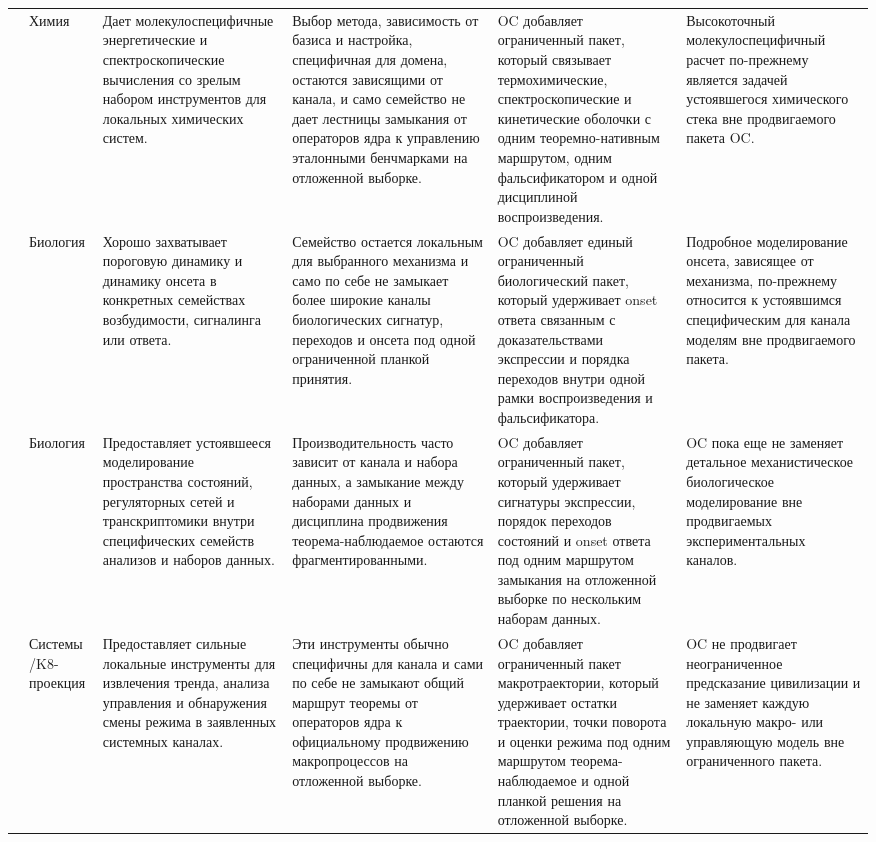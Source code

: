 \begin{longtable}{@{}L{0.17\textwidth}L{0.09\textwidth}L{0.17\textwidth}L{0.17\textwidth}L{0.20\textwidth}L{0.14\textwidth}@{}}
 & Химия & Дает молекулоспецифичные энергетические и спектроскопические вычисления со зрелым набором инструментов для локальных химических систем. & Выбор метода, зависимость от базиса и настройка, специфичная для домена, остаются зависящими от канала, и само семейство не дает лестницы замыкания от операторов ядра к управлению эталонными бенчмарками на отложенной выборке. & OC добавляет ограниченный пакет, который связывает термохимические, спектроскопические и кинетические оболочки с одним теоремно-нативным маршрутом, одним фальсификатором и одной дисциплиной воспроизведения. & Высокоточный молекулоспецифичный расчет по-прежнему является задачей устоявшегося химического стека вне продвигаемого пакета OC. \\
 & Биология & Хорошо захватывает пороговую динамику и динамику онсета в конкретных семействах возбудимости, сигналинга или ответа. & Семейство остается локальным для выбранного механизма и само по себе не замыкает более широкие каналы биологических сигнатур, переходов и онсета под одной ограниченной планкой принятия. & OC добавляет единый ограниченный биологический пакет, который удерживает onset ответа связанным с доказательствами экспрессии и порядка переходов внутри одной рамки воспроизведения и фальсификатора. & Подробное моделирование онсета, зависящее от механизма, по-прежнему относится к устоявшимся специфическим для канала моделям вне продвигаемого пакета. \\
 & Биология & Предоставляет устоявшееся моделирование пространства состояний, регуляторных сетей и транскриптомики внутри специфических семейств анализов и наборов данных. & Производительность часто зависит от канала и набора данных, а замыкание между наборами данных и дисциплина продвижения теорема-наблюдаемое остаются фрагментированными. & OC добавляет ограниченный пакет, который удерживает сигнатуры экспрессии, порядок переходов состояний и onset ответа под одним маршрутом замыкания на отложенной выборке по нескольким наборам данных. & OC пока еще не заменяет детальное механистическое биологическое моделирование вне продвигаемых экспериментальных каналов. \\
 & Системы /\allowbreak K8-проекция & Предоставляет сильные локальные инструменты для извлечения тренда, анализа управления и обнаружения смены режима в заявленных системных каналах. & Эти инструменты обычно специфичны для канала и сами по себе не замыкают общий маршрут теоремы от операторов ядра к официальному продвижению макропроцессов на отложенной выборке. & OC добавляет ограниченный пакет макротраектории, который удерживает остатки траектории, точки поворота и оценки режима под одним маршрутом теорема-наблюдаемое и одной планкой решения на отложенной выборке. & OC не продвигает неограниченное предсказание цивилизации и не заменяет каждую локальную макро- или управляющую модель вне ограниченного пакета. \\

\end{longtable}
